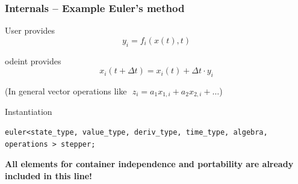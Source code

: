 \documentclass{beamer}
\begin{document}
\begin{frame}[fragile]
  \frametitle{Internals -- Example Euler's method}

User provides 
  \begin{displaymath}
    y_i = f_i( x(t) , t ) %
  \end{displaymath}

odeint provides
  \begin{displaymath}
    x_i (t + \Delta t ) = x_i( t )  + \Delta t \cdot y_i
  \end{displaymath}

(In general vector operations like $\,\, z_i = a_1 x_{1,i} + a_2 x_{2,i} + \dots $)



\vspace{4ex}

Instantiation

\vspace{1ex}

\begin{lstlisting}[basicstyle=\small\ttfamily,escapechar=!]
euler<state_type, value_type, deriv_type, time_type, algebra, operations > stepper;
\end{lstlisting}

\vspace{1ex}

{\bf All elements for container independence and portability are already included in this line!}

\end{frame}
\end{document}
